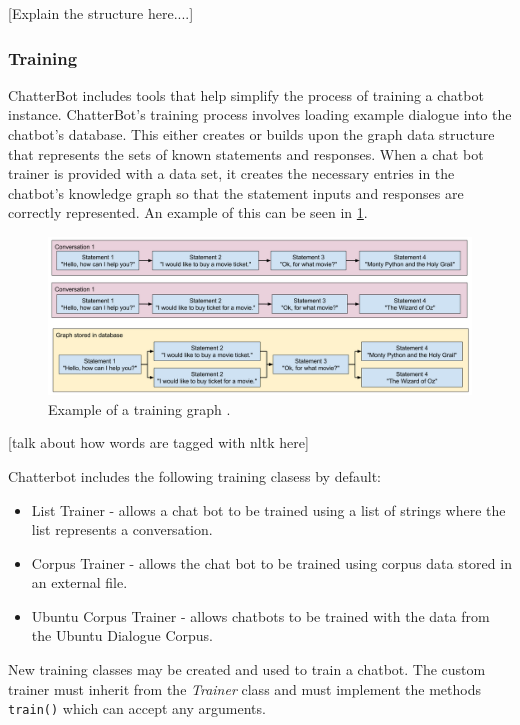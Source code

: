 \documentclass[12pt,a4paper]{article}
\newcommand{\captionstyle}[1] {
    \small{#1}
}
\begin{document}
[Explain the structure here....]

\subsubsection{Training}
ChatterBot includes tools that help simplify the process of training a chatbot instance. ChatterBot’s training process involves loading example dialogue into the chatbot’s database. This either creates or builds upon the graph data structure that represents the sets of known statements and responses. When a chat bot trainer is provided with a data set, it creates the necessary entries in the chatbot’s knowledge graph so that the statement inputs and responses are correctly represented. An example of this can be seen in \cref{fig:training-graph}.

\begin{figure}[!htb]%
    \centering
    \includegraphics[width=1.0\columnwidth]{training-graph}%
    \caption{\captionstyle{Example of a training graph \cite{Chatterbot:online}.}}%
    \label{fig:training-graph}%
\end{figure}

[talk about how words are tagged with nltk here]

Chatterbot includes the following training clasess by default:
\begin{itemize}
    \item List Trainer - allows a chat bot to be trained using a list of strings where the list represents a conversation.
    \item Corpus Trainer - allows the chat bot to be trained using corpus data stored in an external file.
    \item Ubuntu Corpus Trainer - allows chatbots to be trained with the data from the Ubuntu Dialogue Corpus.
\end{itemize}

New training classes may be created and used to train a chatbot. The custom trainer must inherit from the \textit{Trainer} class and must implement the methods \texttt{train()} which can accept any arguments.
\end{document}

